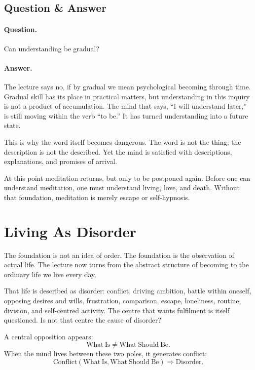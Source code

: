 \subsection{Question \& Answer}

\paragraph{Question.}
Can understanding be gradual?

\paragraph{Answer.}
The lecture says no, if by gradual we mean psychological becoming through time. Gradual skill has its place in practical matters, but understanding in this inquiry is not a product of accumulation. The mind that says, ``I will understand later,'' is still moving within the verb ``to be.'' It has turned understanding into a future state.

This is why the word itself becomes dangerous. The word is not the thing; the description is not the described. Yet the mind is satisfied with descriptions, explanations, and promises of arrival.

At this point meditation returns, but only to be postponed again. Before one can understand meditation, one must understand living, love, and death. Without that foundation, meditation is merely escape or self-hypnosis.

\section{Living As Disorder}

The foundation is not an idea of order. The foundation is the observation of actual life. The lecture now turns from the abstract structure of becoming to the ordinary life we live every day.

That life is described as disorder: conflict, driving ambition, battle within oneself, opposing desires and wills, frustration, comparison, escape, loneliness, routine, division, and self-centred activity. The centre that wants fulfilment is itself questioned. Is not that centre the cause of disorder?

A central opposition appears:
\begin{equation}
\mathrm{What\ Is} \neq \mathrm{What\ Should\ Be}.
\end{equation}
When the mind lives between these two poles, it generates conflict:
\begin{equation}
\mathrm{Conflict}(\mathrm{What\ Is},\mathrm{What\ Should\ Be})
\Rightarrow
\mathrm{Disorder}.
\end{equation}

